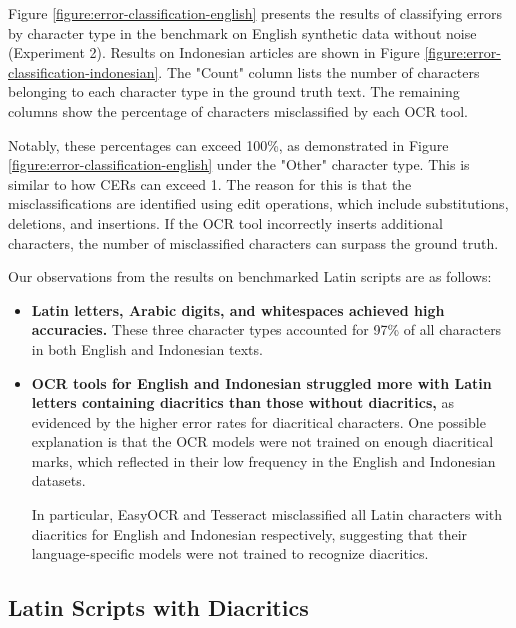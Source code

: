\documentclass[12pt,oneside]{memoir}
\begin{document}
Figure \ref{figure:error-classification-english} presents the results of classifying errors by character type in the benchmark on English synthetic data without noise (Experiment 2). 
Results on Indonesian articles are shown in Figure \ref{figure:error-classification-indonesian}.
The "Count" column lists the number of characters belonging to each character type in the ground truth text.
The remaining columns show the percentage of characters misclassified by each OCR tool.

Notably, these percentages can exceed 100\%, as demonstrated in Figure \ref{figure:error-classification-english} under the "Other" character type.
This is similar to how CERs can exceed 1.
The reason for this is that the misclassifications are identified using edit operations, which include substitutions, deletions, and insertions. 
If the OCR tool incorrectly inserts additional characters, the number of misclassified characters can surpass the ground truth.

Our observations from the results on benchmarked Latin scripts are as follows:

\begin{itemize}
    \item \textbf{Latin letters, Arabic digits, and whitespaces achieved high accuracies.} These three character types accounted for 97\% of all characters in both English and Indonesian texts.
    \item \textbf{OCR tools for English and Indonesian struggled more with Latin letters containing diacritics than those without diacritics,} as evidenced by the higher error rates for diacritical characters.
    One possible explanation is that the OCR models were not trained on enough diacritical marks, which reflected in their low frequency in the English and Indonesian datasets.

    In particular, EasyOCR and Tesseract misclassified all Latin characters with diacritics for English and Indonesian respectively, suggesting that their language-specific models were not trained to recognize diacritics.
\end{itemize}

\subsection{Latin Scripts with Diacritics}
\end{document}
